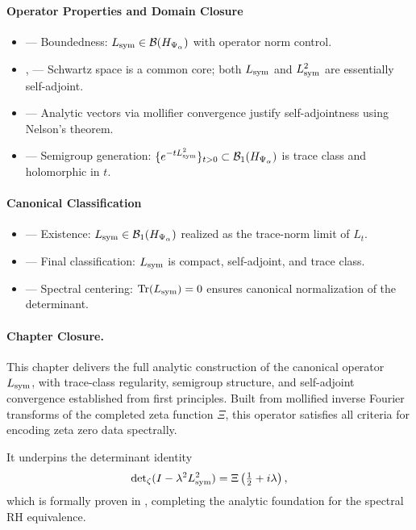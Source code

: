 \paragraph{Operator Properties and Domain Closure}
\begin{itemize}
  \item {} — Boundedness: \( L_{\mathrm{sym}} \in \mathcal{B}(H_{\Psi_\alpha}) \) with operator norm control.
  \item {},  — Schwartz space is a common core; both \( L_{\mathrm{sym}} \) and \( L_{\mathrm{sym}}^2 \) are essentially self-adjoint.
  \item {} — Analytic vectors via mollifier convergence justify self-adjointness using Nelson’s theorem.
  \item {} — Semigroup generation: \( \{ e^{-t L_{\mathrm{sym}}^2} \}_{t > 0} \subset \mathcal{B}_1(H_{\Psi_\alpha}) \) is trace class and holomorphic in \( t \).
\end{itemize}

\paragraph{Canonical Classification}
\begin{itemize}
  \item {} — Existence: \( L_{\mathrm{sym}} \in \mathcal{B}_1(H_{\Psi_\alpha}) \) realized as the trace-norm limit of \( L_t \).
  \item {} — Final classification: \( L_{\mathrm{sym}} \) is compact, self-adjoint, and trace class.
  \item {} — Spectral centering: \( \operatorname{Tr}(L_{\mathrm{sym}}) = 0 \) ensures canonical normalization of the determinant.
\end{itemize}

\paragraph{Chapter Closure.}
This chapter delivers the full analytic construction of the canonical operator \( L_{\mathrm{sym}} \), with trace-class regularity, semigroup structure, and self-adjoint convergence established from first principles. Built from mollified inverse Fourier transforms of the completed zeta function \( \Xi \), this operator satisfies all criteria for encoding zeta zero data spectrally.

It underpins the determinant identity
\[
\det\nolimits_{\zeta}(I - \lambda^2 L_{\mathrm{sym}}^2) = \Xi\left(\tfrac{1}{2} + i\lambda\right),
\]
which is formally proven in , completing the analytic foundation for the spectral RH equivalence.

